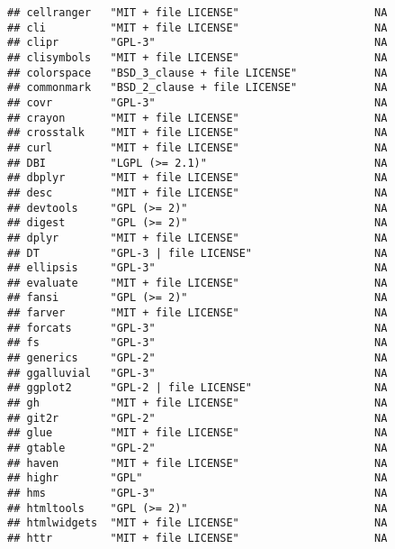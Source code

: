 \documentclass[]{book}
\begin{document}
\begin{verbatim}
## cellranger   "MIT + file LICENSE"                     NA             
## cli          "MIT + file LICENSE"                     NA             
## clipr        "GPL-3"                                  NA             
## clisymbols   "MIT + file LICENSE"                     NA             
## colorspace   "BSD_3_clause + file LICENSE"            NA             
## commonmark   "BSD_2_clause + file LICENSE"            NA             
## covr         "GPL-3"                                  NA             
## crayon       "MIT + file LICENSE"                     NA             
## crosstalk    "MIT + file LICENSE"                     NA             
## curl         "MIT + file LICENSE"                     NA             
## DBI          "LGPL (>= 2.1)"                          NA             
## dbplyr       "MIT + file LICENSE"                     NA             
## desc         "MIT + file LICENSE"                     NA             
## devtools     "GPL (>= 2)"                             NA             
## digest       "GPL (>= 2)"                             NA             
## dplyr        "MIT + file LICENSE"                     NA             
## DT           "GPL-3 | file LICENSE"                   NA             
## ellipsis     "GPL-3"                                  NA             
## evaluate     "MIT + file LICENSE"                     NA             
## fansi        "GPL (>= 2)"                             NA             
## farver       "MIT + file LICENSE"                     NA             
## forcats      "GPL-3"                                  NA             
## fs           "GPL-3"                                  NA             
## generics     "GPL-2"                                  NA             
## ggalluvial   "GPL-3"                                  NA             
## ggplot2      "GPL-2 | file LICENSE"                   NA             
## gh           "MIT + file LICENSE"                     NA             
## git2r        "GPL-2"                                  NA             
## glue         "MIT + file LICENSE"                     NA             
## gtable       "GPL-2"                                  NA             
## haven        "MIT + file LICENSE"                     NA             
## highr        "GPL"                                    NA             
## hms          "GPL-3"                                  NA             
## htmltools    "GPL (>= 2)"                             NA             
## htmlwidgets  "MIT + file LICENSE"                     NA             
## httr         "MIT + file LICENSE"                     NA             

\end{verbatim}
\end{document}

